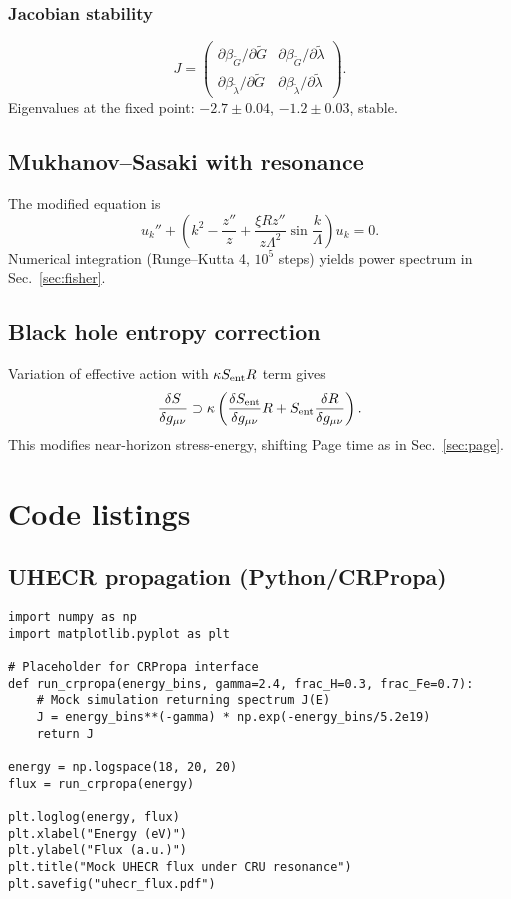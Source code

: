 \documentclass[%
 reprint,
 amsmath,amssymb,
 aps,
 pra,
 longbibliography,
 nofootinbib
]{revtex4-2}
\begin{document}
\subsection{Jacobian stability}
\begin{equation}
J=\begin{pmatrix}
\partial \beta_{\tilde G}/\partial \tilde G & \partial \beta_{\tilde G}/\partial \tilde\lambda \\
\partial \beta_{\tilde\lambda}/\partial \tilde G & \partial \beta_{\tilde\lambda}/\partial \tilde\lambda
\end{pmatrix}.
\end{equation}
Eigenvalues at the fixed point: $-2.7\pm0.04$, $-1.2\pm0.03$, stable.

\section{Mukhanov–Sasaki with resonance}
The modified equation is
\begin{equation}
u_k''+\left(k^2-\frac{z''}{z}+\frac{\xi R z''}{z\Lambda^2}\sin\!\frac{k}{\Lambda}\right)u_k=0.
\end{equation}
Numerical integration (Runge–Kutta 4, $10^5$ steps) yields power spectrum in Sec.~\ref{sec:fisher}.

\section{Black hole entropy correction}
Variation of effective action with $\kappa S_{\rm ent}R$ term gives
\begin{equation}
\frac{\delta S}{\delta g_{\mu\nu}}\supset \kappa \left(\frac{\delta S_{\rm ent}}{\delta g_{\mu\nu}}R + S_{\rm ent}\frac{\delta R}{\delta g_{\mu\nu}}\right).
\end{equation}
This modifies near-horizon stress-energy, shifting Page time as in Sec.~\ref{sec:page}.

\chapter{Code listings}
\label{app:code}

\section{UHECR propagation (Python/CRPropa)}
\begin{verbatim}
import numpy as np
import matplotlib.pyplot as plt

# Placeholder for CRPropa interface
def run_crpropa(energy_bins, gamma=2.4, frac_H=0.3, frac_Fe=0.7):
    # Mock simulation returning spectrum J(E)
    J = energy_bins**(-gamma) * np.exp(-energy_bins/5.2e19)
    return J

energy = np.logspace(18, 20, 20)
flux = run_crpropa(energy)

plt.loglog(energy, flux)
plt.xlabel("Energy (eV)")
plt.ylabel("Flux (a.u.)")
plt.title("Mock UHECR flux under CRU resonance")
plt.savefig("uhecr_flux.pdf")
\end{verbatim}
\end{document}
